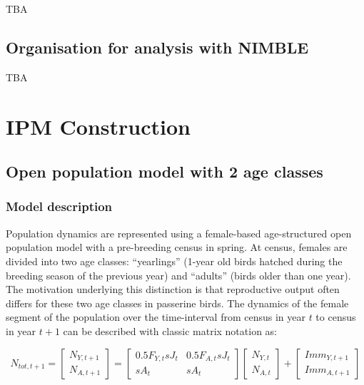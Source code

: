 \documentclass[
]{book}
\begin{document}
TBA

\hypertarget{organisation-for-analysis-with-nimble}{%
\section{Organisation for analysis with NIMBLE}\label{organisation-for-analysis-with-nimble}}

TBA

\hypertarget{IPMCon}{%
\chapter{IPM Construction}\label{IPMCon}}

\hypertarget{open-population-model-with-2-age-classes}{%
\section{Open population model with 2 age classes}\label{open-population-model-with-2-age-classes}}

\hypertarget{model-description}{%
\subsection{Model description}\label{model-description}}

Population dynamics are represented using a female-based age-structured open
population model with a pre-breeding census in spring. At census, females are
divided into two age classes: ``yearlings'' (1-year old birds hatched during the
breeding season of the previous year) and ``adults'' (birds older than one year).
The motivation underlying this distinction is that reproductive output often
differs for these two age classes in passerine birds.
The dynamics of the female segment of the population over the time-interval from
census in year \(t\) to census in year \(t+1\) can be described with classic matrix
notation \citep{Caswell2001} as:

\hfill\break
\[N_{tot,t+1} = \begin{bmatrix} N_{Y,t+1} \\ N_{A,t+1} \end{bmatrix} =
  \begin{bmatrix}
0.5F_{Y,t}sJ_t & 0.5F_{A,t}sJ_t \\
sA_t & sA_t
\end{bmatrix}\begin{bmatrix} N_{Y,t} \\ N_{A,t} \end{bmatrix} +
  \begin{bmatrix} Imm_{Y,t+1} \\ Imm_{A,t+1} \end{bmatrix}\]\\
\end{document}
